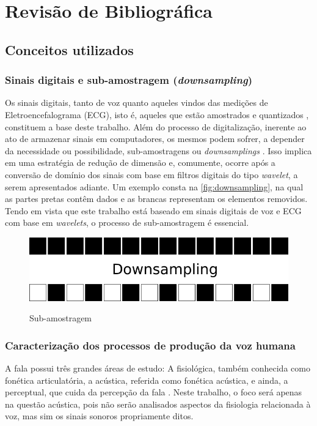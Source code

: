 \chapter{Revisão de Bibliográfica}
	\section{Conceitos utilizados}
	\label{ch:revisao}
		\subsection{Sinais digitais e sub-amostragem (\textit{downsampling})}
			\par Os sinais digitais, tanto de voz quanto aqueles vindos das medições de Eletroencefalograma (ECG), isto é, aqueles que estão amostrados e quantizados \cite{haykin2011sistemas}, constituem a base deste trabalho. Além do processo de digitalização, inerente ao ato de armazenar sinais em computadores, os mesmos podem sofrer, a depender da necessidade ou possibilidade, sub-amostragens ou \textit{downsamplings} \cite{robi2003}. Isso implica em uma estratégia de redução de dimensão e, comumente, ocorre após a conversão de domínio dos sinais com base em filtros digitais do tipo \textit{wavelet}, a serem apresentados adiante. Um exemplo consta na  \autoref{fig:downsampling}, na qual as partes pretas contêm dados e as brancas representam os elementos removidos. Tendo em vista que este trabalho está baseado em sinais digitais de voz e ECG com base em \textit{wavelets}, o processo de sub-amostragem é essencial. 
			\begin{figure}[h]
				\centering
				\caption{Sub-amostragem}
				\includegraphics[width=0.4\linewidth]{images/downsampling}
				\label{fig:downsampling}
			\end{figure}
	
		\subsection{Caracterização dos processos de produção da voz humana}
			\par A fala possui três grandes áreas de estudo: A fisiológica, também conhecida como fonética articulatória, a acústica, referida como fonética acústica, e ainda, a perceptual, que cuida da percepção  da  fala \cite{kremer2014eficiencia}. Neste trabalho, o foco será apenas na questão acústica, pois não serão analisados aspectos da fisiologia relacionada à voz, mas sim os sinais sonoros propriamente ditos.
		
